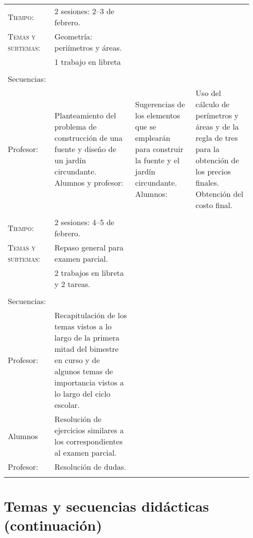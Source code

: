\documentclass[letterpaper,10pt]{article}
\begin{document}
\begin{tabular}[t]{R{0.25\textwidth}p{0.71\textwidth}}
\textsc{Tiempo:}          & 2 sesiones: 2--3  de febrero. \\
    \textsc{Temas y subtemas:}& Geometr\'ia: peri\'imetros y \'areas.\\    
    & 1 trabajo en libreta\\ \\
    \large{\sc Secuencias:} \\
    Profesor:   & Planteamiento del problema de construcci\'on de una fuente y
    dise\~no de un jard\'in circundante.
    Alumnos y profesor:& Sugerencias de los elementos que se emplear\'an para 
    construir la fuente y el jard\'in circundante. 
    Alumnos:    & Uso del c\'alculo de per\'imetros y \'areas y de la regla de
    tres para la obtenci\'on de los precios finales. Obtenci\'on del costo 
    final.
\\ \hline \\
\textsc{Tiempo:}          & 2 sesiones: 4--5  de febrero. \\
    \textsc{Temas y subtemas:}& Repaso general para examen parcial.\\    
    & 2 trabajos en libreta y 2 tareas. \\ \\
    \large{\sc Secuencias:} \\
    Profesor:   & Recapitulaci\'on de los temas vistos a lo largo de la primera 
    mitad del bimestre en curso y de algunos temas de importancia vistos a lo 
    largo del ciclo escolar. \\
    Alumnos     & Resoluci\'on de ejercicios similares a los correspondientes al
    examen parcial. \\
    Profesor:   & Resoluci\'on de dudas.
\\ \hline \\ 
\end{tabular}

\section{Temas  y secuencias did\'acticas (continuaci\'on)}
\end{document}

